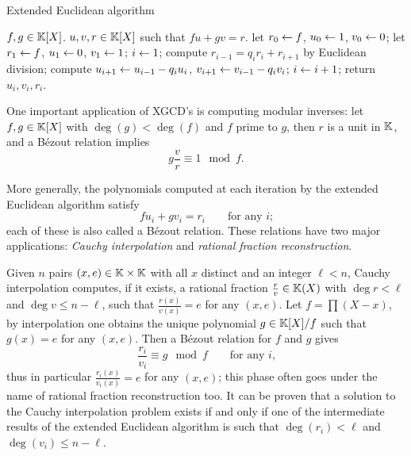 \begin{algorithm}
  \caption{Extended Euclidean algorithm}
  \begin{algorithmic}[1]
    \REQUIRE $f,g\in\mathbb{K}[X]$.
    \ENSURE $u,v,r\in\mathbb{K}[X]$ such that $fu+gv=r$.
    \STATE let $r_0\leftarrow f$, $u_0\leftarrow1$, $v_0\leftarrow0$;
    \STATE let $r_1\leftarrow f$, $u_1\leftarrow0$, $v_1\leftarrow1$;
    \STATE $i\leftarrow1$;
    \STATE compute $r_{i-1} = q_ir_i + r_{i+1}$ by Euclidean division;
    \STATE compute $u_{i+1} \leftarrow u_{i-1} - q_iu_i$, $v_{i+1} \leftarrow v_{i-1} - q_iv_i$;
    \STATE $i\leftarrow i+1$;
    \ENDWHILE
    \STATE return $u_i,v_i,r_i$.
  \end{algorithmic}
\end{algorithm}

One important application of XGCD's is computing modular inverses: let
$f,g\in\mathbb{K}[X]$ with $\deg(g)<\deg(f)$ and $f$ prime to $g$, then $r$ is
a unit in $\mathbb{K}$, and a Bézout relation implies
\begin{equation}
  \label{eq:206}
  g\frac{v}{r} \equiv 1 \mod f
  \text{.}
\end{equation}

More generally, the polynomials computed at each iteration by the
extended Euclidean algorithm satisfy
\begin{equation}
  \label{eq:156}
  fu_i + gv_i =  r_i
  \qquad\text{for any $i$;}
\end{equation}
each of these is also called a Bézout relation. These relations have
two major applications: \emph{Cauchy interpolation} and \emph{rational
  fraction reconstruction}.

Given $n$ pairs $(x,e)\in\mathbb{K}\times\mathbb{K}$ with all $x$ distinct and an
integer $\ell<n$, Cauchy interpolation
computes, if it exists, a rational fraction $\frac{r}{v}\in\mathbb{K}(X)$ with
$\deg r<\ell$ and $\deg v \le n-\ell$, such that $\frac{r(x)}{v(x)}=e$
for any $(x,e)$. Let $f=\prod (X-x)$, by interpolation one obtains the
unique polynomial $g\in\mathbb{K}[X]/f$ such that $g(x)=e$ for any
$(x,e)$. Then a Bézout relation for $f$ and $g$ gives
\begin{equation}
  \label{eq:207}
  \frac{r_i}{v_i} \equiv g \mod f
  \qquad\text{for any $i$,}
\end{equation}
thus in particular $\frac{r_i(x)}{v_i(x)}=e$ for any $(x,e)$; this
phase often goes under the name of rational fraction reconstruction
too. It can be proven that a solution to the Cauchy interpolation
problem exists if and only if one of the intermediate results of the
extended Euclidean algorithm is such that $\deg(r_i)<\ell$ and
$\deg(v_i)\le n-\ell$.

